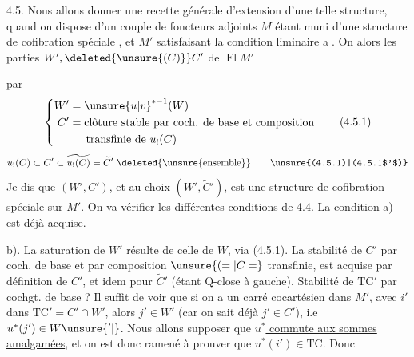 4.5. Nous allons donner une recette générale d'extension d'une telle structure, quand on dispose d'un couple de foncteurs adjoints
$M$ étant muni d'une structure de cofibration spéciale , et $M'$ satisfaisant la condition liminaire \textcircled{a}. On  alors les parties $W',\deleted{\unsure{(C)}}C'$ de $\operatorname{Fl}M'$

par
\[
\left\{\begin{aligned} W'&=\unsure{u|v}^{*-1}(W)\\ C'&=\text{clôture stable par coch. de base et composition}\\ &\hspace{1.5em}\text{transfinie de }u_!(C)
\end{aligned}\right.\tag*{(4.5.1)}
\]
\[
u_!(C)\subset C'\subset\widetilde{u_!(C)}=\widetilde C'\ \deleted{\unsure{\text{ensemble}}}\tag*{\unsure{(4.5.1)|(4.5.1$'$)}}
\]
Je dis que  $(W',C')$, et au choix $(W',\widetilde C')$, est une structure de cofibration spéciale sur $M'$. On va vérifier les différentes conditions de 4.4. La condition a) est déjà acquise.

b). La saturation  de $W'$ résulte de celle de $W$, via (4.5.1). La stabilité de $C'$ par coch. de base et par composition $\unsure{(=|C=}$ transfinie, est acquise par définition de $C'$, et idem pour $\widetilde C'$ (étant Q-close à gauche). Stabilité de $\mathrm{TC}'$ par cochgt. de base ? Il suffit de voir que si on a un carré cocartésien 
dans $M'$, avec $i'$ dans $\mathrm{TC}'=C'\cap W'$, alors $j'\in W'$ (car on sait déjà $j'\in C'$), i.e \margin{$\Vert$}$u^*(j')\in W\unsure{^{\prime}|{}}$. Nous allons supposer que \uline{$u^*$ commute aux sommes amalgamées}, et on est donc ramené à prouver que $u^*(i')\in\mathrm{TC}$. Donc

